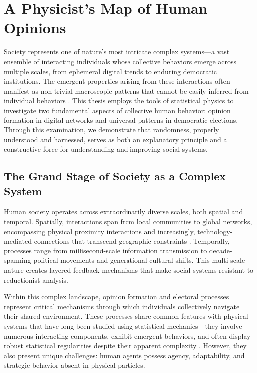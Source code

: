 \chapter{A Physicist's Map of Human Opinions}
\label{chap1}
Society represents one of nature's most intricate complex systems—a vast ensemble of interacting individuals whose collective behaviors emerge across multiple scales, from ephemeral digital trends to enduring democratic institutions. The emergent properties arising from these interactions often manifest as non-trivial macroscopic patterns that cannot be easily inferred from individual behaviors \cite{galam2012sociophysics}. This thesis employs the tools of statistical physics to investigate two fundamental aspects of collective human behavior: opinion formation in digital networks and universal patterns in democratic elections. Through this examination, we demonstrate that randomness, properly understood and harnessed, serves as both an explanatory principle and a constructive force for understanding and improving social systems.

\section{The Grand Stage of Society as a Complex System}
Human society operates across extraordinarily diverse scales, both spatial and temporal. Spatially, interactions span from local communities to global networks, encompassing physical proximity interactions and increasingly, technology-mediated connections that transcend geographic constraints \cite{social-media-as-public-opinion}. Temporally, processes range from millisecond-scale information transmission to decade-spanning political movements and generational cultural shifts. This multi-scale nature creates layered feedback mechanisms that make social systems resistant to reductionist analysis.

Within this complex landscape, opinion formation and electoral processes represent critical mechanisms through which individuals collectively navigate their shared environment. These processes share common features with physical systems that have long been studied using statistical mechanics—they involve numerous interacting components, exhibit emergent behaviors, and often display robust statistical regularities despite their apparent complexity \cite{galam1982sociophysics, galam1991towards}. However, they also present unique challenges: human agents possess agency, adaptability, and strategic behavior absent in physical particles.

